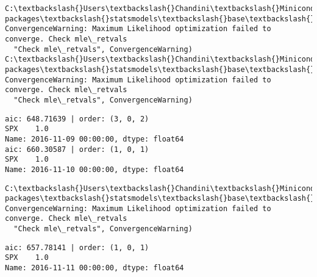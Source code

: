 \documentclass[11pt]{article}
\begin{document}
    \begin{Verbatim}[commandchars=\\\{\}]
C:\textbackslash{}Users\textbackslash{}Chandini\textbackslash{}Miniconda3\textbackslash{}envs\textbackslash{}auquan\textbackslash{}lib\textbackslash{}site-packages\textbackslash{}statsmodels\textbackslash{}base\textbackslash{}model.py:496: ConvergenceWarning: Maximum Likelihood optimization failed to converge. Check mle\_retvals
  "Check mle\_retvals", ConvergenceWarning)
C:\textbackslash{}Users\textbackslash{}Chandini\textbackslash{}Miniconda3\textbackslash{}envs\textbackslash{}auquan\textbackslash{}lib\textbackslash{}site-packages\textbackslash{}statsmodels\textbackslash{}base\textbackslash{}model.py:496: ConvergenceWarning: Maximum Likelihood optimization failed to converge. Check mle\_retvals
  "Check mle\_retvals", ConvergenceWarning)

    \end{Verbatim}

    \begin{Verbatim}[commandchars=\\\{\}]
aic: 648.71639 | order: (3, 0, 2)
SPX    1.0
Name: 2016-11-09 00:00:00, dtype: float64
aic: 660.30587 | order: (1, 0, 1)
SPX    1.0
Name: 2016-11-10 00:00:00, dtype: float64

    \end{Verbatim}

    \begin{Verbatim}[commandchars=\\\{\}]
C:\textbackslash{}Users\textbackslash{}Chandini\textbackslash{}Miniconda3\textbackslash{}envs\textbackslash{}auquan\textbackslash{}lib\textbackslash{}site-packages\textbackslash{}statsmodels\textbackslash{}base\textbackslash{}model.py:496: ConvergenceWarning: Maximum Likelihood optimization failed to converge. Check mle\_retvals
  "Check mle\_retvals", ConvergenceWarning)

    \end{Verbatim}

    \begin{Verbatim}[commandchars=\\\{\}]
aic: 657.78141 | order: (1, 0, 1)
SPX    1.0
Name: 2016-11-11 00:00:00, dtype: float64

    \end{Verbatim}
\end{document}
